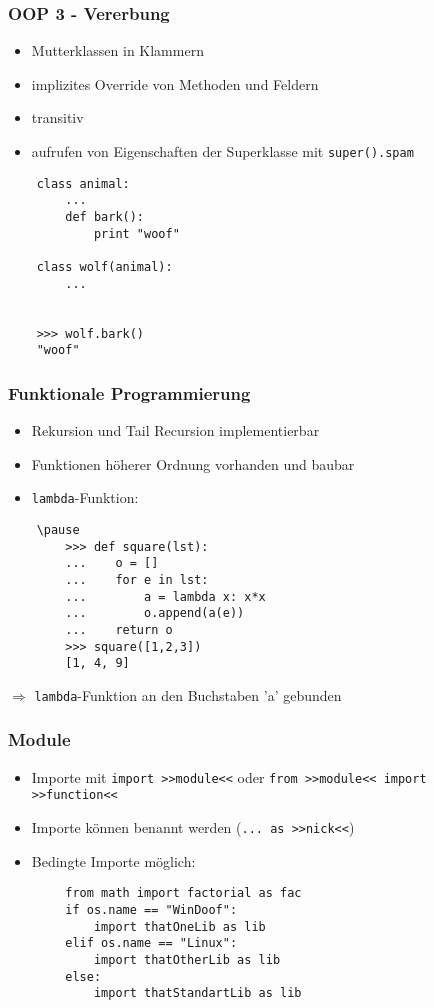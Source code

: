 \documentclass{beamer}
\begin{document}
\begin{frame}[fragile]
	\frametitle{OOP 3 - Vererbung}
	\begin{itemize}
		\item Mutterklassen in Klammern
		\item implizites Override von Methoden und Feldern
		\item transitiv
		\item aufrufen von Eigenschaften der Superklasse mit \texttt{super().spam}
	\end{itemize}
	\pause
	\begin{lstlisting}
	class animal:
	    ...
	    def bark():
	        print "woof"
	    	
	class wolf(animal):
	    ...
	    
	    
	>>> wolf.bark()
	"woof"
	\end{lstlisting}
\end{frame}

\begin{frame}[fragile]
	\frametitle{Funktionale Programmierung}
	\begin{itemize}
		\item Rekursion und Tail Recursion implementierbar
		\item Funktionen höherer Ordnung vorhanden und baubar
		\item \texttt{lambda}-Funktion:
	\end{itemize}
	\begin{lstlisting}
	\pause
		>>> def square(lst):
		...    o = []
		...    for e in lst:
		...        a = lambda x: x*x
		...        o.append(a(e))
		...    return o
		>>> square([1,2,3])
		[1, 4, 9]
	\end{lstlisting}
	$\Rightarrow$ \texttt{lambda}-Funktion an den Buchstaben 'a' gebunden
\end{frame}

\begin{frame}[fragile]
	\frametitle{Module}
	\begin{itemize}
		\item Importe mit \texttt{import >>module<<} oder \texttt{from >>module<< import >>function<<}
		\item Importe können benannt werden (\texttt{... as >>nick<<})
		\item Bedingte Importe möglich:
	\end{itemize}
	\pause
	\begin{lstlisting}
		from math import factorial as fac
		if os.name == "WinDoof":
		    import thatOneLib as lib
		elif os.name == "Linux":
		    import thatOtherLib as lib
		else:
		    import thatStandartLib as lib
	\end{lstlisting}
\end{frame}
\end{document}
